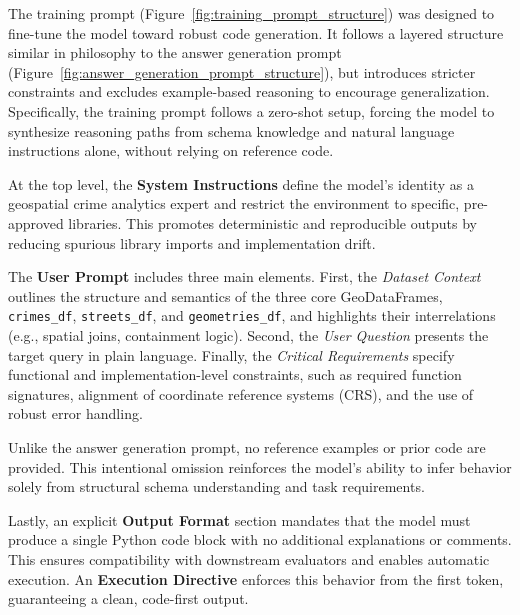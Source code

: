 The training prompt (Figure~\ref{fig:training_prompt_structure}) was designed to fine-tune the model toward robust code generation. It follows a layered structure similar in philosophy to the answer generation prompt (Figure~\ref{fig:answer_generation_prompt_structure}), but introduces stricter constraints and excludes example-based reasoning to encourage generalization. Specifically, the training prompt follows a zero-shot setup, forcing the model to synthesize reasoning paths from schema knowledge and natural language instructions alone, without relying on reference code.

At the top level, the \textbf{System Instructions} define the model’s identity as a geospatial crime analytics expert and restrict the environment to specific, pre-approved libraries. This promotes deterministic and reproducible outputs by reducing spurious library imports and implementation drift.

The \textbf{User Prompt} includes three main elements. First, the \textit{Dataset Context} outlines the structure and semantics of the three core GeoDataFrames, \texttt{crimes\_df}, \texttt{streets\_df}, and \texttt{geometries\_df}, and highlights their interrelations (e.g., spatial joins, containment logic). Second, the \textit{User Question} presents the target query in plain language. Finally, the \textit{Critical Requirements} specify functional and implementation-level constraints, such as required function signatures, alignment of coordinate reference systems (CRS), and the use of robust error handling.

Unlike the answer generation prompt, no reference examples or prior code are provided. This intentional omission reinforces the model's ability to infer behavior solely from structural schema understanding and task requirements.

Lastly, an explicit \textbf{Output Format} section mandates that the model must produce a single Python code block with no additional explanations or comments. This ensures compatibility with downstream evaluators and enables automatic execution. An \textbf{Execution Directive} enforces this behavior from the first token, guaranteeing a clean, code-first output.

